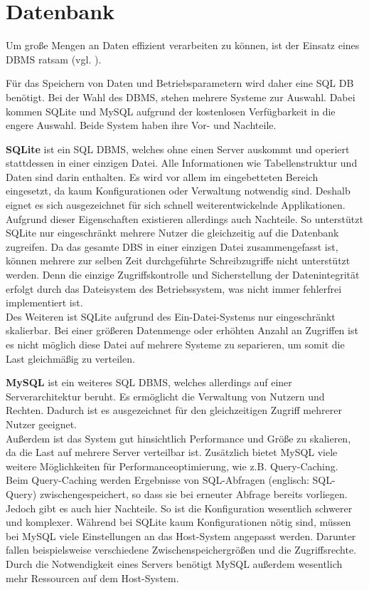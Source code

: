 \section{Datenbank}
\label{section_Datenbank}

Um große Mengen an Daten effizient verarbeiten zu können, ist der Einsatz eines \ac{DBMS} ratsam (vgl. \citep{saake2010datenbanken}).

Für das Speichern von Daten und Betriebsparametern wird daher eine \ac{SQL} \ac{DB} benötigt. Bei der Wahl des \ac{DBMS}, stehen mehrere Systeme zur Auswahl. Dabei kommen SQLite und MySQL aufgrund der kostenlosen Verfügbarkeit in die engere Auswahl.
Beide System haben ihre Vor- und Nachteile.


\textbf{SQLite} ist ein \ac{SQL} \ac{DBMS}, welches ohne einen Server auskommt und operiert stattdessen in einer einzigen Datei. Alle Informationen wie Tabellenstruktur und Daten sind darin enthalten. Es wird vor allem im eingebetteten Bereich eingesetzt, da kaum Konfigurationen oder Verwaltung notwendig sind. Deshalb eignet es sich ausgezeichnet für sich schnell weiterentwickelnde Applikationen.
\\
Aufgrund dieser Eigenschaften existieren allerdings auch Nachteile. So unterstützt SQLite nur eingeschränkt mehrere Nutzer die gleichzeitig auf die Datenbank zugreifen. Da das gesamte \ac{DBS} in einer einzigen Datei zusammengefasst ist, können mehrere zur selben Zeit durchgeführte Schreibzugriffe nicht unterstützt werden. Denn die einzige Zugriffskontrolle und Sicherstellung der Datenintegrität erfolgt durch das Dateisystem des Betriebssystem, was nicht immer fehlerfrei implementiert ist.
\\
Des Weiteren ist SQLite aufgrund des Ein-Datei-Systems nur eingeschränkt skalierbar. Bei einer größeren Datenmenge oder erhöhten Anzahl an Zugriffen ist es nicht möglich diese Datei auf mehrere Systeme zu separieren, um somit die Last gleichmäßig zu verteilen.

\textbf{MySQL} ist ein weiteres \ac{SQL} \ac{DBMS}, welches allerdings auf einer Serverarchitektur beruht. 
Es ermöglicht die Verwaltung von Nutzern und Rechten. Dadurch ist es ausgezeichnet für den gleichzeitigen Zugriff mehrerer Nutzer geeignet.\\ Außerdem ist das System gut hinsichtlich Performance und Größe zu skalieren, da die Last auf mehrere Server verteilbar ist. Zusätzlich bietet MySQL viele weitere Möglichkeiten für Performanceoptimierung, wie z.B. Query-Caching. Beim Query-Caching werden Ergebnisse von SQL-Abfragen (englisch: SQL-Query) zwischengespeichert, so dass sie bei erneuter Abfrage bereits vorliegen.
\\
Jedoch gibt es auch hier Nachteile. So ist die Konfiguration wesentlich schwerer und komplexer. Während bei SQLite kaum Konfigurationen nötig sind, müssen bei MySQL viele Einstellungen an das Host-System angepasst werden. Darunter fallen beispielsweise verschiedene Zwischenspeichergrößen und die Zugriffsrechte. Durch die Notwendigkeit eines Servers benötigt MySQL außerdem wesentlich mehr Ressourcen auf dem Host-System.

